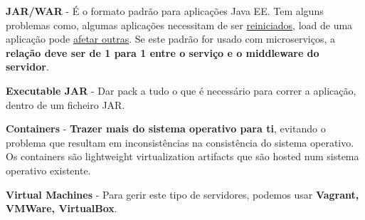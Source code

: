 \documentclass{article}
\begin{document}
\textbf{JAR/WAR} - É o formato padrão para aplicações Java EE.
Tem alguns problemas como, algumas aplicações necessitam de ser \uline{reiniciados},
load de uma aplicação pode \uline{afetar outras}. Se este padrão
for usado com microserviços, a \textbf{relação deve ser de 1 para 1
entre o serviço e o middleware do servidor}.

\vspace{2mm}

\textbf{Executable JAR} - Dar pack a tudo o que é necessário
para correr a aplicação, dentro de um ficheiro JAR.

\vspace{2mm}

\textbf{Containers} - \textbf{Trazer mais do sistema operativo
para ti}, evitando o problema que resultam em inconsistências
na consistência do sistema operativo. Os containers são lightweight
virtualization artifacts que são hosted num sistema operativo
existente.

\vspace{2mm}

\textbf{Virtual Machines} - Para gerir este tipo de servidores, podemos usar
\textbf{Vagrant, VMWare, VirtualBox}.
\end{document}
